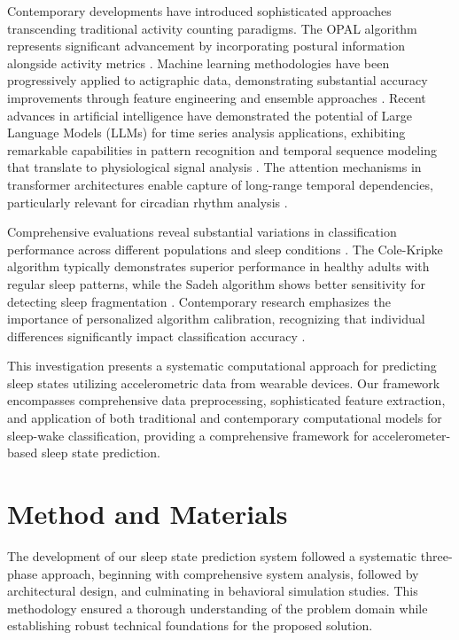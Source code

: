\documentclass[conference]{IEEEtran}
\begin{document}
Contemporary developments have introduced sophisticated approaches transcending traditional activity counting paradigms. The OPAL algorithm represents significant advancement by incorporating postural information alongside activity metrics \cite{hickey2021smart}. Machine learning methodologies have been progressively applied to actigraphic data, demonstrating substantial accuracy improvements through feature engineering and ensemble approaches \cite{beattie2017estimation}. Recent advances in artificial intelligence have demonstrated the potential of Large Language Models (LLMs) for time series analysis applications, exhibiting remarkable capabilities in pattern recognition and temporal sequence modeling that translate to physiological signal analysis \cite{jin2023time}. The attention mechanisms in transformer architectures enable capture of long-range temporal dependencies, particularly relevant for circadian rhythm analysis \cite{zhou2023onellm}.

Comprehensive evaluations reveal substantial variations in classification performance across different populations and sleep conditions \cite{martin2011wrist}. The Cole-Kripke algorithm typically demonstrates superior performance in healthy adults with regular sleep patterns, while the Sadeh algorithm shows better sensitivity for detecting sleep fragmentation \cite{cellini2013direct}. Contemporary research emphasizes the importance of personalized algorithm calibration, recognizing that individual differences significantly impact classification accuracy \cite{koesmahargyo2019accuracy}.

This investigation presents a systematic computational approach for predicting sleep states utilizing accelerometric data from wearable devices. Our framework encompasses comprehensive data preprocessing, sophisticated feature extraction, and application of both traditional and contemporary computational models for sleep-wake classification, providing a comprehensive framework for accelerometer-based sleep state prediction.

\section{Method and Materials}

The development of our sleep state prediction system followed a systematic three-phase approach, beginning with comprehensive system analysis, followed by architectural design, and culminating in behavioral simulation studies. This methodology ensured a thorough understanding of the problem domain while establishing robust technical foundations for the proposed solution.
\end{document}
